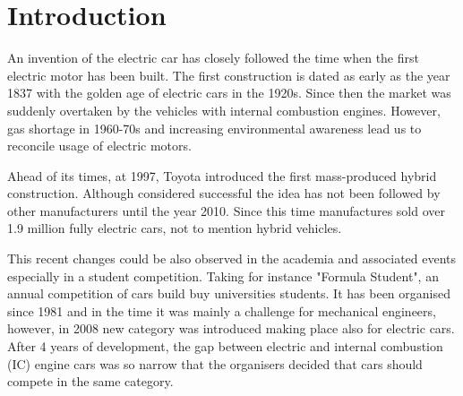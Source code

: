 





\chapter{Introduction}

An invention of the electric car has closely followed the time when the first electric motor has been built. The first construction is dated as early as the year 1837 with the golden age of electric cars in the 1920s. Since then the market was suddenly overtaken by the vehicles with internal combustion engines. However, gas shortage in 1960-70s and increasing environmental awareness lead us to reconcile usage of electric motors.

Ahead of its times, at 1997, Toyota introduced the first mass-produced hybrid construction. Although considered successful the idea has not been followed by other manufacturers until the year 2010. Since this time manufactures sold over 1.9 million fully electric cars, not to mention hybrid vehicles. 

This recent changes could be also observed in the academia and associated events especially in a student competition. Taking for instance "Formula Student", an annual competition of cars build buy universities students. It has been organised since 1981 and in the time it was mainly a challenge for mechanical engineers, however, in 2008 new category was introduced making place also for electric cars.
After 4 years of development, the gap between electric and internal combustion (IC) engine cars was so narrow that the organisers decided that cars should compete in the same category.

